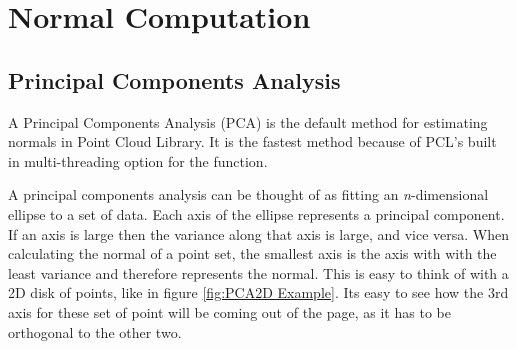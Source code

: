 \section{Normal Computation}
	\subsection{Principal Components Analysis}
		A Principal Components Analysis (PCA) is the default method for estimating normals in Point Cloud Library. It is the fastest method because of PCL's built in multi-threading option for the function.
		
		A principal components analysis can be thought of as fitting an \textit{n}-dimensional ellipse to a set of data. Each axis of the ellipse represents a principal component. If an axis is large then the variance along that axis is large, and vice versa. When calculating the normal of a point set, the smallest axis is the axis with with the least variance and therefore represents the normal. This is easy to think of with a 2D disk of points, like in figure \ref{fig:PCA2D Example}. Its easy to see how the 3rd axis for these set of point will be coming out of the page, as it has to be orthogonal to the other two.
		
